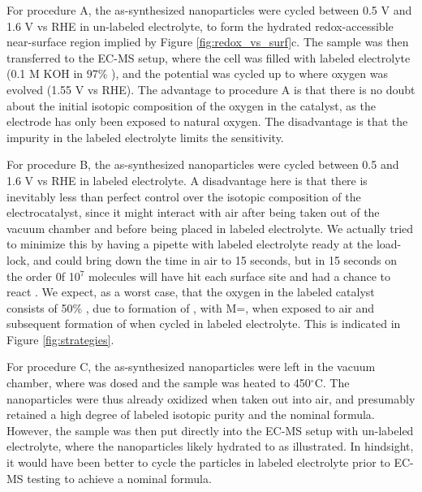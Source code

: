 For procedure A, the as-synthesized nanoparticles were cycled between 0.5 V and 1.6 V vs RHE in un-labeled electrolyte, to form the hydrated redox-accessible near-surface region implied by Figure \ref{fig:redox_vs_surf}c. The sample was then transferred to the EC-MS setup, where the cell was filled with labeled electrolyte (0.1 M KOH in 97\% ), and the potential was cycled up to where oxygen was evolved (1.55 V vs RHE). The advantage to procedure A is that there is no doubt about the initial isotopic composition of the oxygen in the catalyst, as the electrode has only been exposed to natural oxygen. The disadvantage is that the  impurity in the labeled electrolyte limits the sensitivity. 

For procedure B, the as-synthesized nanoparticles were cycled between 0.5 and 1.6 V vs RHE in labeled electrolyte. A disadvantage here is that there is inevitably less than perfect control over the isotopic composition of the electrocatalyst, since it might interact with air after being taken out of the vacuum chamber and before being placed in labeled electrolyte. We actually tried to minimize this by having a pipette with labeled electrolyte ready at the load-lock, and could bring down the time in air to 15 seconds, but in 15 seconds on the order 0f 10$^7$  molecules will have hit each surface site and had a chance to react \cite{Concepts2003}. We expect, as a worst case, that the oxygen in the labeled catalyst consists of 50\% , due to formation of , with M=, when exposed to air and subsequent formation of  when cycled in labeled electrolyte. This is indicated in Figure \ref{fig:strategies}.

For procedure C, the as-synthesized nanoparticles were left in the vacuum chamber, where  was dosed and the sample was heated to 450$^\circ$C. The nanoparticles were thus already oxidized when taken out into air, and presumably retained a high degree of labeled isotopic purity and the nominal  formula. However, the sample was then put directly into the EC-MS setup with un-labeled electrolyte, where the nanoparticles likely hydrated to  as illustrated. In hindsight, it would have been better to cycle the particles in labeled electrolyte prior to EC-MS testing to achieve a nominal  formula.

